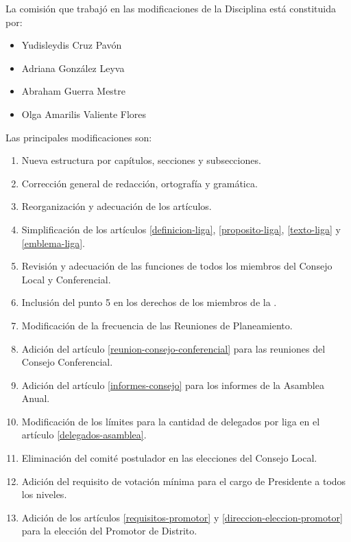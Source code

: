 
La comisión que trabajó en las modificaciones de la Disciplina está constituida por:
\begin{itemize}
    \item Yudisleydis Cruz Pavón
    \item Adriana González Leyva
    \item Abraham Guerra Mestre
    \item Olga Amarilis Valiente Flores
\end{itemize}

Las principales modificaciones son:
\begin{enumerate}
    \item Nueva estructura por capítulos, secciones y subsecciones.
    \item Corrección general de redacción, ortografía y gramática.
    \item Reorganización y adecuación de los artículos.
    \item Simplificación de los artículos \ref{definicion-liga}, \ref{proposito-liga}, \ref{texto-liga} y \ref{emblema-liga}.
    \item Revisión y adecuación de las funciones de todos los miembros del Consejo Local y Conferencial.
    \item Inclusión del punto 5 en los derechos de los miembros de la \LMJ{}.
    \item Modificación de la frecuencia de las Reuniones de Planeamiento.
    \item Adición del artículo \ref{reunion-consejo-conferencial} para las reuniones del Consejo Conferencial.
    \item Adición del artículo \ref{informes-consejo} para los informes de la Asamblea Anual.
    \item Modificación de los límites para la cantidad de delegados por liga en el artículo \ref{delegados-asamblea}.
    \item Eliminación del comité postulador en las elecciones del Consejo Local.
    \item Adición del requisito de votación mínima para el cargo de Presidente a todos los niveles.
    \item Adición de los artículos \ref{requisitos-promotor} y \ref{direccion-eleccion-promotor} para la elección del Promotor de Distrito.
\end{enumerate}
